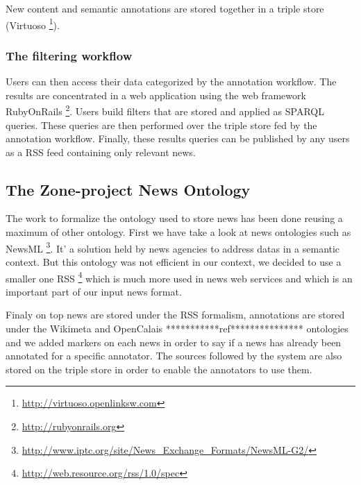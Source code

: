 \documentclass{llncs}
\begin{document}
New content and semantic annotations are stored together in a triple store (Virtuoso \footnote{\url{http://virtuoso.openlinksw.com}}). 


 
\subsubsection{The filtering workflow}
Users can then access their data categorized by the annotation workflow. The results are concentrated in a web application using the web framework RubyOnRails \footnote{\url{http://rubyonrails.org}}. Users build filters that are stored and applied as SPARQL queries. These queries are then performed over the triple store fed by the annotation workflow. Finally, these results queries can be published by any users as a RSS feed containing only relevant news.

%
\subsection{The Zone-project News Ontology}
The work to formalize the ontology used to store news has been done reusing a maximum of other ontology. 
First we have take a look at news ontologies such as NewsML \footnote{\url{http://www.iptc.org/site/News\_Exchange\_Formats/NewsML-G2/}}. It' a solution held by news agencies to address datas in a semantic context. But this ontology was not efficient in our context, we decided to use a smaller one RSS \footnote{\url{http://web.resource.org/rss/1.0/spec}} which is much more used in news web services and which is an important part of our input news format. 

Finaly on top news are stored under the RSS formalism, annotations are stored under the Wikimeta and OpenCalais ***********ref*************** ontologies and we added markers on each news in order to say if a news has already been annotated for a specific annotator. The sources followed by the system are also stored on the triple store in order to enable the annotators to use them.

%


%
\end{document}
